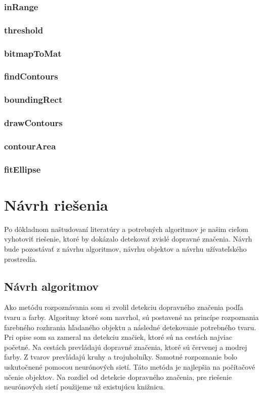 \documentclass[12pt]{article}
\begin{document}
\subsubsection{inRange}
\subsubsection{threshold}
\subsubsection{bitmapToMat}
\subsubsection{findContours}
\subsubsection{boundingRect}
\subsubsection{drawContours}
\subsubsection{contourArea}
\subsubsection{fitEllipse}

\section{Návrh riešenia}
Po dôkladnom naštudovaní literatúry a potrebných algoritmov je našim cieľom vyhotoviť riešenie, ktoré by dokázalo detekovať zvislé dopravné značenia.
Návrh bude pozostávať z návrhu algoritmov, návrhu objektov a návrhu užívateľského prostredia.
\subsection{Návrh algoritmov}
Ako metódu rozpoznávania som si zvolil detekciu dopravného značenia podľa tvaru a farby. 
Algoritmy ktoré som navrhol, sú postavené na princípe rozpoznania farebného rozhrania hľadaného objektu a následné detekovanie potrebného tvaru.
Pri opise som sa zameral na detekciu značiek, ktoré sú na cestách najviac početné.
Na cestách prevládajú dopravné značenia, ktoré sú červenej a modrej farby. Z tvarov prevládajú kruhy a trojuholníky.
Samotné rozpoznanie bolo uskutočnené pomocou neurónových sietí. Táto metóda je najlepšia na počítačové učenie objektov.
Na rozdiel od detekcie dopravného značenia, pre riešenie neurónových sietí použijeme už existujúcu knižnicu.
\end{document}
